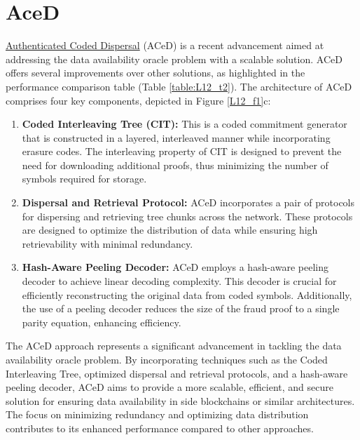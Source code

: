 \section{AceD}
\href{https://arxiv.org/abs/2011.00102}{Authenticated Coded Dispersal} (ACeD) is a recent advancement aimed at addressing the data availability oracle problem with a scalable solution. ACeD offers several improvements over other solutions, as highlighted in the performance comparison table (Table \ref{table:L12_t2}). The architecture of ACeD comprises four key components, depicted in Figure \ref{L12_f1}c:
\begin{enumerate}
	\item \textbf{Coded Interleaving Tree (CIT):} This is a coded commitment generator that is constructed in a layered, interleaved manner while incorporating erasure codes. The interleaving property of CIT is designed to prevent the need for downloading additional proofs, thus minimizing the number of symbols required for storage.
	\item \textbf{Dispersal and Retrieval Protocol:} ACeD incorporates a pair of protocols for dispersing and retrieving tree chunks across the network. These protocols are designed to optimize the distribution of data while ensuring high retrievability with minimal redundancy.
	\item \textbf{Hash-Aware Peeling Decoder:} ACeD employs a hash-aware peeling decoder to achieve linear decoding complexity. This decoder is crucial for efficiently reconstructing the original data from coded symbols. Additionally, the use of a peeling decoder reduces the size of the fraud proof to a single parity equation, enhancing efficiency.
\end{enumerate}
The ACeD approach represents a significant advancement in tackling the data availability oracle problem. By incorporating techniques such as the Coded Interleaving Tree, optimized dispersal and retrieval protocols, and a hash-aware peeling decoder, ACeD aims to provide a more scalable, efficient, and secure solution for ensuring data availability in side blockchains or similar architectures. The focus on minimizing redundancy and optimizing data distribution contributes to its enhanced performance compared to other approaches.
